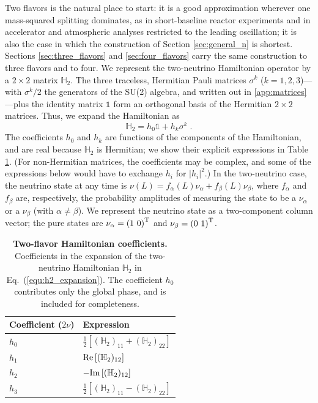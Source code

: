 \documentclass[final,5p,times,twocolumn,sort,compress]{elsarticle}
\newcommand{\eq}{Eq.}
\newcommand{\equ}[1]{\eq~(\ref{equ:#1})}
\begin{document}
Two flavors is the natural place to start: it is a good approximation wherever one mass-squared splitting dominates, as in short-baseline reactor experiments and in accelerator and atmospheric analyses restricted to the leading oscillation; it is also the case in which the construction of Section \ref{sec:general_n} is shortest.  Sections \ref{sec:three_flavors} and \ref{sec:four_flavors} carry the same construction to three flavors and to four.  We represent the two-neutrino Hamiltonian operator by a $2 \times 2$ matrix $\mathbb{H}_2$.  The three traceless, Hermitian Pauli matrices $\sigma^k$ ($k=1,2,3$)---with $\sigma^k/2$ the generators of the SU(2) algebra, and written out in \ref{app:matrices}---plus the identity matrix $\mathbb{1}$ form an orthogonal basis of the Hermitian $2 \times 2$ matrices.  Thus, we expand the Hamiltonian as
\begin{equation}
 \label{equ:h2_expansion}
 \mathbb{H}_2 = h_0 \mathbb{1} + h_k \sigma^k \;.
\end{equation}
The coefficients $h_0$ and $h_k$ are functions of the components of the Hamiltonian, and are real because $\mathbb{H}_2$ is Hermitian; we show their explicit expressions in Table \ref{tab:h2_coefficients}.  (For non-Hermitian matrices, the coefficients may be complex, and some of the expressions below would have to exchange $h_i$ for $|h_i|^2$.)  In the two-neutrino case, the neutrino state at any time is $\nu(L) = f_\alpha(L) \nu_\alpha + f_\beta(L) \nu_\beta$, where $f_\alpha$ and $f_\beta$ are, respectively, the probability amplitudes of measuring the state to be a $\nu_\alpha$ or a $\nu_\beta$ (with $\alpha \neq \beta$).  We represent the neutrino state as a two-component column vector; the pure states are $\nu_\alpha = \left(1~0\right)^{\rm T}$ and $\nu_\beta = \left(0~1\right)^{\rm T}$.

{\def\arraystretch{1.2}
\begin{table}[t!]
 \begin{tabular}{ll}
  Coefficient ($2\nu$) & Expression \\
  \hline
  $h_0$ & $\frac{1}{2}\left[(\mathbb{H}_2)_{11}+(\mathbb{H}_2)_{22}\right]$ \\
  $h_1$ & ${\rm Re}\left[ (\mathbb{H}_2)_{12} \right]$ \\
  $h_2$ & $-{\rm Im}\left[ (\mathbb{H}_2)_{12} \right]$ \\
  $h_3$ & $\frac{1}{2}\left[(\mathbb{H}_2)_{11}-(\mathbb{H}_2)_{22}\right]$ \\
 \end{tabular}
 \caption{\label{tab:h2_coefficients}{\bf Two-flavor Hamiltonian coefficients.} Coefficients in the expansion of the two-neutrino Hamiltonian $\mathbb{H}_2$ in \equ{h2_expansion}.  The coefficient $h_0$ contributes only the global phase, and is included for completeness.}
\end{table}
}
\end{document}
